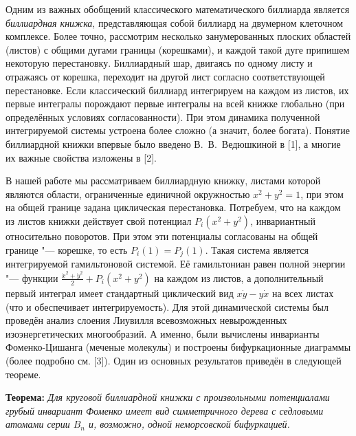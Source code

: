 



\vzmscaption
Одним из важных обобщений классического математического биллиарда является \textit{биллиардная книжка}, представляющая собой биллиард на двумерном клеточном комплексе. Более точно, рассмотрим несколько занумерованных плоских областей (листов) с общими дугами границы (корешками), и каждой такой дуге припишем некоторую перестановку. Биллиардный шар, двигаясь по одному листу и отражаясь от корешка, переходит на другой лист согласно соответствующей перестановке. Если классический биллиард интегрируем на каждом из листов, их первые интегралы порождают первые интегралы на всей книжке глобально (при определённых условиях согласованности). При этом динамика полученной интегрируемой системы устроена более сложно (а значит, более богата). Понятие биллиардной книжки впервые было введено В.~В.~Ведюшкиной в [1], а многие их важные свойства изложены в [2].

В нашей работе мы рассматриваем биллиардную книжку, листами которой являются области, ограниченные единичной окружностью $x^2+y^2=1$, при этом на общей границе задана циклическая перестановка. Потребуем, что на каждом из листов книжки действует свой потенциал $P_i(x^2+y^2)$, инвариантный относительно поворотов. При этом эти потенциалы согласованы на общей границе "--- корешке, то есть $P_i(1)=P_j(1)$. Такая система является интегрируемой гамильтоновой системой. Её гамильтониан равен полной энергии "--- функции $\frac{\dot{x}^2+\dot{y}^2}{2}+P_i(x^2+y^2)$ на каждом из листов, а дополнительный первый интеграл имеет стандартный циклический вид $x\dot y-y \dot x$ на всех листах (что и обеспечивает интегрируемость). Для этой динамической системы был проведён анализ слоения Лиувилля всевозможных невырожденных изоэнергетических многообразий. А именно, были вычислены инварианты Фоменко-Цишанга (меченые молекулы) и построены бифуркационные диаграммы (более подробно см. [3]). Один из основных результатов приведён в следующей теореме.

\textbf{Теорема:}
	\textit{Для круговой биллиардной книжки с произвольными потенциалами грубый инвариант Фоменко имеет вид симметричного дерева с седловыми атомами серии $B_n$ и, возможно, одной неморсовской бифуркацией.}

